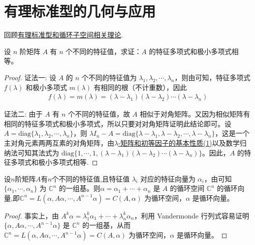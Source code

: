 \documentclass[../../main.tex]{subfiles}%
\begin{document}
\section{有理标准型的几何与应用}

回顾\hyperref[section:有理标准型]{有理标准型和循环子空间相关理论}.

\begin{proposition}\label{proposition:矩阵有不同特征值则特征多项式和极小多项式一定相等}
设 $n$ 阶矩阵 $A$ 有 $n$ 个不同的特征值，求证：$A$ 的特征多项式和极小多项式相等。
\end{proposition}
\begin{proof}

{\color{blue}证法一:}
设 $A$ 的 $n$ 个不同的特征值为 $\lambda_1,\lambda_2,\cdots,\lambda_n$，则由可知，特征多项式 $f(\lambda)$ 和极小多项式 $m(\lambda)$ 有相同的根（不计重数），因此 
\begin{align*}
f(\lambda)=m(\lambda)=(\lambda - \lambda_1)(\lambda - \lambda_2)\cdots(\lambda - \lambda_n)
\end{align*}

{\color{blue}证法二:}
由于 $A$ 有 $n$ 个不同的特征值，故 $A$ 相似于对角矩阵。又因为相似矩阵有相同的特征多项式和极小多项式，所以只要对对角矩阵证明此结论即可。设 $A = \mathrm{diag}\{\lambda_1,\lambda_2,\cdots,\lambda_n\}$，则 $\lambda I_n - A = \mathrm{diag}\{\lambda - \lambda_1,\lambda - \lambda_2,\cdots,\lambda - \lambda_n\}$，这是一个主对角元素两两互素的对角矩阵，由\hyperref[theorem:lambda-矩阵和初等因子的基本性质]{$\lambda$-矩阵和初等因子的基本性质(1)}以及数学归纳法可知其法式为 $\mathrm{diag}\{1,\cdots,1,(\lambda - \lambda_1)(\lambda - \lambda_2)\cdots(\lambda - \lambda_n)\}$。因此，$A$ 的特征多项式和极小多项式相等.

\end{proof}

\begin{proposition}\label{proposition:不同特征值对应的特征向量之和恰好构成循环向量}
设$n$阶矩阵$A$有$n$个不同的特征值,且特征值 $\lambda_i$ 对应的特征向量为 $\alpha_i$，由可知$\{\alpha_1,\cdots,\alpha_n\}$ 为 $\mathbb{C}^n$ 的一组基。则$\alpha = \alpha_1 + \cdots + \alpha_n$ 是 $A$ 的循环空间 $\mathbb{C}^n$ 的循环向量,即$\mathbb{C}^n = L(\alpha,A\alpha,\cdots,A^{n - 1}\alpha)=C(A,\alpha)$ 为循环空间，$\alpha$ 是循环向量。
\end{proposition}
\begin{proof}

事实上，由 $A^k\alpha = \lambda_1^k\alpha_1 + \cdots + \lambda_n^k\alpha_n$，利用 Vandermonde 行列式容易证明 $\{\alpha,A\alpha,\cdots,A^{n - 1}\alpha\}$ 是 $\mathbb{C}^n$ 的一组基，从而 $\mathbb{C}^n = L(\alpha,A\alpha,\cdots,A^{n - 1}\alpha)=C(A,\alpha)$ 为循环空间，$\alpha$ 是循环向量。

\end{proof}
\end{document}
